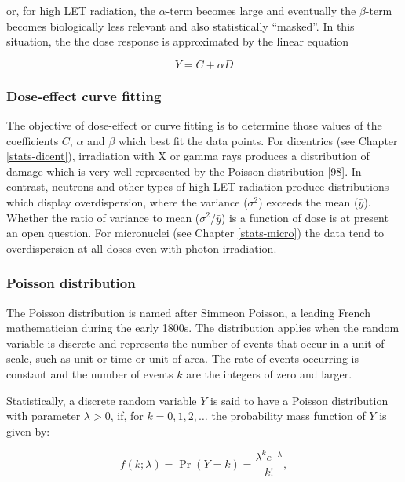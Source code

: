 \documentclass[]{scrartcl}
\begin{document}
or, for high LET radiation, the \(\alpha\)-term becomes large and eventually the \(\beta\)-term becomes biologically less relevant and also statistically ``masked''. In this situation, the the dose response is
approximated by the linear equation

\begin{equation} 
  Y = C + \alpha D
  \label{eq:dose-response-l}
\end{equation}

\hypertarget{dose-effect-curve-fitting}{%
\subsubsection{Dose-effect curve fitting}\label{dose-effect-curve-fitting}}

The objective of dose-effect or curve fitting is to determine those values of the coefficients \(C\), \(\alpha\) and \(\beta\) which best fit the data points. For dicentrics (see Chapter \ref{stats-dicent}), irradiation with X or gamma rays produces a distribution of damage which is very well represented by the Poisson distribution {[}98{]}. In contrast, neutrons and other types of high LET radiation produce distributions which display overdispersion, where the variance (\(\sigma^{2}\)) exceeds the mean (\(\bar{y}\)). Whether the ratio of variance to mean (\(\sigma^{2}/\bar{y}\)) is a function of dose is at present an open question. For micronuclei (see Chapter \ref{stats-micro}) the data tend to overdispersion at all doses even with photon irradiation.

\hypertarget{poisson-distribution}{%
\subsubsection{Poisson distribution}\label{poisson-distribution}}

The Poisson distribution is named after Simmeon Poisson, a leading French mathematician during the early 1800s. The distribution applies when the random variable is discrete and represents the number of events that occur in a unit-of-scale, such as unit-or-time or unit-of-area. The rate of events occurring is constant and the number of events \(k\) are the integers of zero and larger.

Statistically, a discrete random variable \(Y\) is said to have a Poisson distribution with parameter \(\lambda > 0\), if, for \(k = 0, 1, 2, \dots\) the probability mass function of \(Y\) is given by:

\begin{equation}
    f(k; \lambda) = \Pr(Y = k)= \frac{\lambda^k e^{-\lambda}}{k!},
    \label{eq:poisson-dist}
\end{equation}
\end{document}
